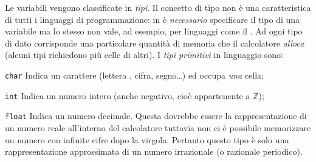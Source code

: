 Le variabili vengono classificate in \emph{tipi}.
Il concetto di tipo non è una caratteristica di tutti i linguaggi di programmazione: in  è \emph{necessario} specificare il tipo di una variabile ma lo stesso non vale, ad esempio, per linguaggi come il .
Ad ogni tipo di dato corrisponde una particolare quantità di memoria che il calcolatore \emph{alloca} (alcuni tipi richiedono più celle di altri).
I \emph{tipi primitivi} in linguaggio  sono:
\begin{description}
	\item\lstinline!char! Indica un carattere (lettera , cifra, segno\dots) ed occupa \emph{una} cella;
	\item\lstinline!int! Indica un numero intero (anche negativo, cioè appartenente a $\mathbb{Z}$);
	\item\lstinline!float! Indica un numero decimale.
Questa dovrebbe essere la rappresentazione di un numero reale all'interno del calcolatore tuttavia non ci è possibile memorizzare un numero con infinite cifre dopo la virgola.
Pertanto questo tipo è solo una rappresentazione approssimata di un numero irrazionale (o razionale periodico).
\end{description}

